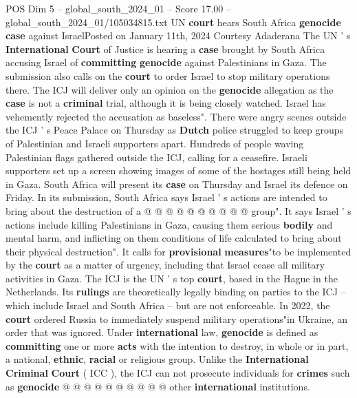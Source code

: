 \begin{textsample}{POS Dim 5 – global\_south\_2024\_01 – Score 17.00 – global\_south\_2024\_01/105034815.txt}  \label{ex:f5_pos_018}
UN \textbf{court} hears South Africa \textbf{genocide} \textbf{case} against IsraelPosted on January 11th, 2024 Courtesy Adaderana The UN ' s \textbf{International} \textbf{Court} of Justice is hearing a \textbf{case} brought by South Africa accusing Israel of \textbf{committing} \textbf{genocide} against Palestinians in Gaza.
The submission also calls on the \textbf{court} to order Israel to stop military operations there.
The ICJ will deliver only an opinion on the \textbf{genocide} allegation as the \textbf{case} is not a \textbf{criminal} trial, although it is being closely watched.
Israel has vehemently rejected the accusation as baseless".
There were angry scenes outside the ICJ ' s Peace Palace on Thursday as \textbf{Dutch} police struggled to keep groups of Palestinian and Israeli supporters apart.
Hundreds of people waving Palestinian flags gathered outside the ICJ, calling for a ceasefire.
Israeli supporters set up a screen showing images of some of the hostages still being held in Gaza.
South Africa will present its \textbf{case} on Thursday and Israel its defence on Friday.
In its submission, South Africa says Israel ' s actions are intended to bring about the destruction of a @ @ @ @ @ @ @ @ @ @ group".
It says Israel ' s actions include killing Palestinians in Gaza, causing them serious \textbf{bodily} and mental harm, and inflicting on them conditions of life calculated to bring about their physical destruction".
It calls for \textbf{provisional} \textbf{measures}"to be implemented by the \textbf{court} as a matter of urgency, including that Israel cease all military activities in Gaza.
The ICJ is the UN ' s top \textbf{court}, based in the Hague in the Netherlands.
Its \textbf{rulings} are theoretically legally binding on parties to the ICJ -- which include Israel and South Africa -- but are not enforceable.
In 2022, the \textbf{court} ordered Russia to immediately suspend military operations"in Ukraine, an order that was ignored.
Under \textbf{international} law, \textbf{genocide} is defined as \textbf{committing} one or more \textbf{acts} with the intention to destroy, in whole or in part, a national, \textbf{ethnic}, \textbf{racial} or religious group.
Unlike the \textbf{International} \textbf{Criminal} \textbf{Court} ( ICC ), the ICJ can not prosecute individuals for \textbf{crimes} such as \textbf{genocide} @ @ @ @ @ @ @ @ @ @ other \textbf{international} institutions.

\end{textsample}
